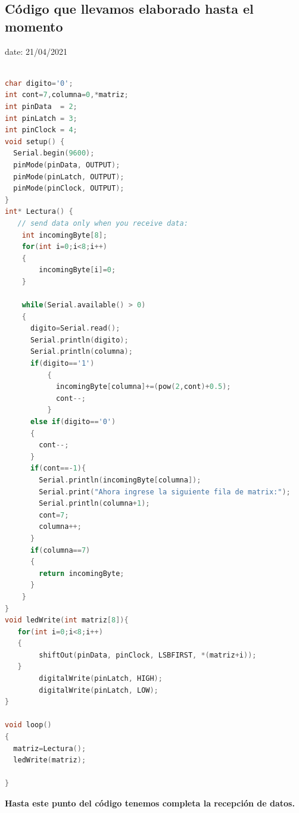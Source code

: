 \documentclass{article}
\begin{document}
\subsection{Código que llevamos elaborado hasta el momento}
date: 21/04/2021
\begin{lstlisting}[language=C++, label=codigocompleto]

char digito='0';
int cont=7,columna=0,*matriz;
int pinData  = 2;
int pinLatch = 3;
int pinClock = 4;
void setup() {
  Serial.begin(9600);
  pinMode(pinData, OUTPUT);
  pinMode(pinLatch, OUTPUT);
  pinMode(pinClock, OUTPUT);
}
int* Lectura() {
   // send data only when you receive data:
  	int incomingByte[8];
  	for(int i=0;i<8;i++)
  	{
    	incomingByte[i]=0;
  	}

    while(Serial.available() > 0)
    {
      digito=Serial.read();
      Serial.println(digito); 
      Serial.println(columna);
      if(digito=='1')
          {
            incomingByte[columna]+=(pow(2,cont)+0.5);
        	cont--;
          }
      else if(digito=='0')
      {
        cont--;
      }
      if(cont==-1){
        Serial.println(incomingByte[columna]);
        Serial.print("Ahora ingrese la siguiente fila de matrix:");
        Serial.println(columna+1);
        cont=7;
        columna++;
      }
      if(columna==7)
      {
        return incomingByte;
      }
    }
}
void ledWrite(int matriz[8]){
   for(int i=0;i<8;i++)
   {   
    	shiftOut(pinData, pinClock, LSBFIRST, *(matriz+i));
   }
  		digitalWrite(pinLatch, HIGH);
   		digitalWrite(pinLatch, LOW);
}

void loop()
{
  matriz=Lectura();
  ledWrite(matriz);
  
}
 \end{lstlisting}
 
\textbf{Hasta este punto del código tenemos completa la recepción de datos.}



\vspace{0.5cm}
\end{document}

